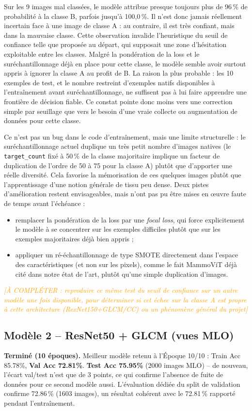 \documentclass[12pt,a4paper]{report}
\newcommand{\todo}[1]{\textcolor{orange}{\textit{[À COMPLÉTER : #1]}}}
\begin{document}
Sur les 9 images mal classées, le modèle attribue presque toujours plus de
96\,\% de probabilité à la classe B, parfois jusqu'à 100,0\,\%. Il n'est
donc jamais réellement \og{}incertain\fg{} face à une image de classe A :
au contraire, il est très confiant, mais dans la mauvaise classe. Cette
observation invalide l'heuristique du seuil de confiance telle que proposée
au départ, qui supposait une zone d'hésitation exploitable entre les
classes. Malgré la pondération de la loss et le suréchantillonnage déjà en
place pour cette classe, le modèle semble avoir surtout appris à ignorer la
classe A au profit de B. La raison la plus probable : les 10 exemples de
test, et le nombre restreint d'exemples natifs disponibles à
l'entraînement avant suréchantillonnage, ne suffisent pas à lui faire
apprendre une frontière de décision fiable. Ce constat pointe donc moins
vers une correction simple par seuillage que vers le besoin d'une vraie
collecte ou augmentation de données pour cette classe.

Ce n'est pas un bug dans le code d'entraînement, mais une limite
structurelle : le suréchantillonnage actuel duplique un très petit nombre
d'images natives (le \texttt{target\_count} fixé à 50\,\% de la classe
majoritaire implique un facteur de duplication de l'ordre de 50 à 75 pour
la classe A) plutôt que d'apporter une réelle diversité. Cela favorise la
mémorisation de ces quelques images plutôt que l'apprentissage d'une notion
générale de tissu peu dense. Deux pistes d'amélioration restent
envisageables, mais n'ont pas pu être mises en \oe{}uvre faute de temps
avant l'échéance :\\
\begin{itemize}
    \item remplacer la pondération de la loss par une \emph{focal loss},
    qui force explicitement le modèle à se concentrer sur les exemples
    difficiles plutôt que sur les exemples majoritaires déjà bien appris ;
    \item appliquer un ré-échantillonnage de type SMOTE directement dans
    l'espace des caractéristiques (et non sur les pixels), comme le fait
    MammoViT \cite{ref19} déjà cité dans notre état de l'art, plutôt qu'une
    simple duplication d'images.
\end{itemize}
\todo{reproduire ce même test du seuil de confiance sur un autre modèle une
fois disponible, pour déterminer si cet échec sur la classe A est propre à
cette architecture (RexNet150+GLCM/CC) ou un phénomène général du projet}

\subsection{Modèle 2 -- ResNet50 + GLCM (vues MLO)}
\textbf{Terminé (10 époques).} Meilleur modèle retenu à l'Époque 10/10 :
Train Acc 85.78\%, \textbf{Val Acc 72.81\%}. \textbf{Test Acc 75.95\%}
(2000 images MLO) -- de nouveau, l'écart val/test n'est que de 3 points, ce
qui confirme l'absence de fuite de données pour ce second modèle aussi.
L'évaluation dédiée du split de validation confirme 72.86\,\% (1603
images), un résultat cohérent avec le 72.81\,\% rapporté pendant
l'entraînement.
\end{document}

